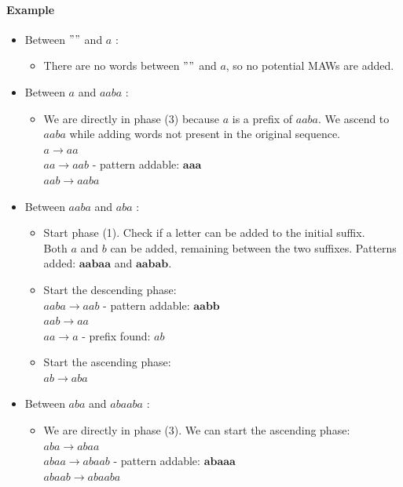 \documentclass[conference]{IEEEtran}
\begin{document}
\paragraph{Example}
\begin{itemize}
\item Between $""$ and $a$ :
\begin{itemize}
\item There are no words between $""$ and $a$, so no potential MAWs are added.
\end{itemize}
\item Between $a$ and $aaba$ :
\begin{itemize}
\item We are directly in phase (3) because $a$ is a prefix of $aaba$. We ascend to $aaba$ while adding words not present in the original sequence.\\
$a \longrightarrow aa$\\
$aa \longrightarrow aab$ - pattern addable: $\mathbf{aaa}$\\
$aab\longrightarrow aaba$
\end{itemize}
\item Between $aaba$ and $aba$ :
\begin{itemize}
\item Start phase (1). Check if a letter can be added to the initial suffix.\\
Both $a$ and $b$ can be added, remaining between the two suffixes. Patterns added: $\mathbf{aabaa}$ and $\mathbf{aabab}$.
\item Start the descending phase:\\
$aaba \longrightarrow aab$ - pattern addable: $\mathbf{aabb}$\\
$aab \longrightarrow aa$\\
$aa\longrightarrow a$ - prefix found: $ab$
\item Start the ascending phase:\\
$ab\longrightarrow aba$
\end{itemize}
\item Between $aba$ and $abaaba$ :
\begin{itemize}
\item We are directly in phase (3). We can start the ascending phase:\\
$aba\longrightarrow abaa$\\
$abaa\longrightarrow abaab$ - pattern addable: $\mathbf{abaaa}$\\
$abaab \longrightarrow abaaba$
\end{itemize}

\end{itemize}
\end{document}

